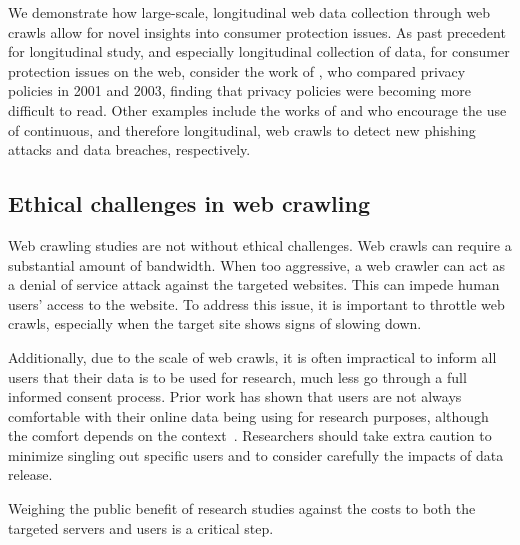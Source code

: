 We demonstrate how large-scale, longitudinal web data collection through web crawls allow for novel insights into consumer protection issues. As past precedent for longitudinal study, and especially longitudinal collection of data, for consumer protection issues on the web, consider the work of \citet{milne2006longitudinal}, who compared privacy policies in 2001 and 2003, finding that privacy policies were becoming more difficult to read. Other examples include the works of \citet{nathezhtha2019wc} and \citet{trabelsi2019monitoring} who encourage the use of continuous, and therefore longitudinal, web crawls to detect new phishing attacks and data breaches, respectively. 

\subsection{Ethical challenges in web crawling}
Web crawling studies are not without ethical challenges. Web crawls can require a substantial amount of bandwidth. When too aggressive, a web crawler can act as a denial of service attack against the targeted websites. This can impede human users' access to the website. To address this issue, it is important to throttle web crawls, especially when the target site shows signs of slowing down.

Additionally, due to the scale of web crawls, it is often impractical to inform all users that their data is to be used for research, much less go through a full informed consent process. Prior work has shown that users are not always comfortable with their online data being using for research purposes, although the comfort depends on the context~\cite{fiesler2018participant}. Researchers should take extra caution to minimize singling out specific users and to consider carefully the impacts of data release.

Weighing the public benefit of research studies against the costs to both the targeted servers and users is a critical step.


